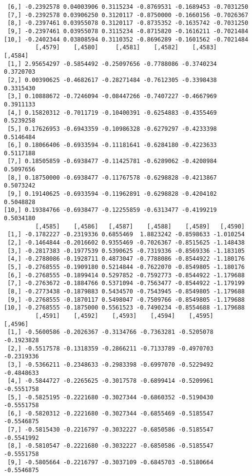 \documentclass[
  letterpaper,
  DIV=11,
  numbers=noendperiod]{scrreprt}
\begin{document}
\begin{verbatim}
 [6,] -0.2392578 0.04003906 0.3115234 -0.8769531 -0.1689453 -0.7031250
 [7,] -0.2392578 0.03906250 0.3120117 -0.8750000 -0.1660156 -0.7026367
 [8,] -0.2397461 0.03955078 0.3120117 -0.8735352 -0.1635742 -0.7031250
 [9,] -0.2397461 0.03955078 0.3115234 -0.8715820 -0.1616211 -0.7021484
[10,] -0.2402344 0.03808594 0.3110352 -0.8696289 -0.1601562 -0.7021484
         [,4579]    [,4580]     [,4581]    [,4582]    [,4583]   [,4584]
 [1,] 2.95654297 -0.5854492 -0.25097656 -0.7788086 -0.3740234 0.3720703
 [2,] 0.00390625 -0.4682617 -0.28271484 -0.7612305 -0.3398438 0.3315430
 [3,] 0.10888672 -0.7246094 -0.08447266 -0.7407227 -0.4667969 0.3911133
 [4,] 0.15820312 -0.7011719 -0.10400391 -0.6254883 -0.4355469 0.5239258
 [5,] 0.17626953 -0.6943359 -0.10986328 -0.6279297 -0.4233398 0.5146484
 [6,] 0.18066406 -0.6933594 -0.11181641 -0.6284180 -0.4223633 0.5117188
 [7,] 0.18505859 -0.6938477 -0.11425781 -0.6289062 -0.4208984 0.5097656
 [8,] 0.18750000 -0.6938477 -0.11767578 -0.6298828 -0.4213867 0.5073242
 [9,] 0.19140625 -0.6933594 -0.11962891 -0.6298828 -0.4204102 0.5048828
[10,] 0.19384766 -0.6938477 -0.12255859 -0.6313477 -0.4199219 0.5034180
         [,4585]    [,4586]   [,4587]    [,4588]    [,4589]   [,4590]
 [1,] -0.1782227 -0.2319336 0.6855469  1.8823242 -0.8598633 -1.010254
 [2,] -0.1464844 -0.2016602 0.9355469 -0.7026367 -0.8515625 -1.148438
 [3,] -0.2817383 -0.1977539 0.5390625 -0.7319336 -0.8569336 -1.183105
 [4,] -0.2788086 -0.1928711 0.4873047 -0.7788086 -0.8544922 -1.180176
 [5,] -0.2768555 -0.1909180 0.5214844 -0.7622070 -0.8549805 -1.180176
 [6,] -0.2768555 -0.1899414 0.5297852 -0.7592773 -0.8544922 -1.179688
 [7,] -0.2763672 -0.1884766 0.5371094 -0.7563477 -0.8544922 -1.179199
 [8,] -0.2773438 -0.1879883 0.5434570 -0.7543945 -0.8549805 -1.179688
 [9,] -0.2768555 -0.1870117 0.5498047 -0.7509766 -0.8549805 -1.179688
[10,] -0.2768555 -0.1875000 0.5561523 -0.7490234 -0.8554688 -1.179688
         [,4591]    [,4592]    [,4593]    [,4594]    [,4595]    [,4596]
 [1,] -0.5600586 -0.2026367 -0.3134766 -0.7363281 -0.5205078 -0.1923828
 [2,] -0.5517578 -0.1318359 -0.2866211 -0.7133789 -0.4970703 -0.2319336
 [3,] -0.5366211 -0.2348633 -0.2983398 -0.6997070 -0.5229492 -0.4848633
 [4,] -0.5844727 -0.2265625 -0.3017578 -0.6899414 -0.5209961 -0.5551758
 [5,] -0.5825195 -0.2221680 -0.3027344 -0.6860352 -0.5190430 -0.5551758
 [6,] -0.5820312 -0.2221680 -0.3027344 -0.6855469 -0.5185547 -0.5546875
 [7,] -0.5815430 -0.2216797 -0.3032227 -0.6850586 -0.5185547 -0.5541992
 [8,] -0.5810547 -0.2221680 -0.3032227 -0.6850586 -0.5185547 -0.5551758
 [9,] -0.5805664 -0.2216797 -0.3037109 -0.6845703 -0.5180664 -0.5546875

\end{verbatim}
\end{document}
